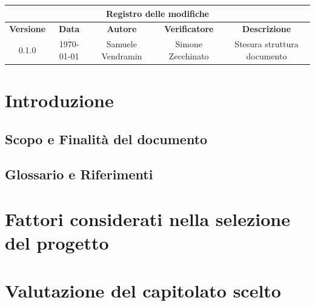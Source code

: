 \documentclass[a4paper, 10pt, colorlinks=true, linkcolor=black, urlcolor=blue, citecolor=blue, hidelinks]{article}
\begin{document}
\newcommand{\tipoverbale}{- Analisi dei Capitolati}
\newcommand{\dataverbale}{}
\newcommand{\dataversione}{\today}
\newcommand{\versione}{0.1.0}
\newcommand{\stato}{Stesura}
\newcommand{\destinatari}{The Bitless, prof. Tullio Vardanega, prof. Riccardo Cardin}

\begin{titlepage}

\end{titlepage}

\newpage
{}

\begin{center}
    \begin{tabular}{|c|c|c|c|c|}
        \hline
        \multicolumn{5}{|c|}{\textbf{Registro delle modifiche}} \\
        \hline
        \textbf{Versione} & \textbf{Data} & \textbf{Autore} & \textbf{Verificatore} & \textbf{Descrizione} \\
        \hline
        0.1.0 & \today & Samuele Vendramin & Simone Zecchinato     & Stesura struttura documento \\
        \hline
    \end{tabular}
\end{center}

\newpage
\tableofcontents 

\newpage

\section{Introduzione}

\subsection{Scopo e Finalità del documento}

\subsection{Glossario e Riferimenti}

\section{Fattori considerati nella selezione del progetto}

\section{Valutazione del capitolato scelto}
\end{document}
